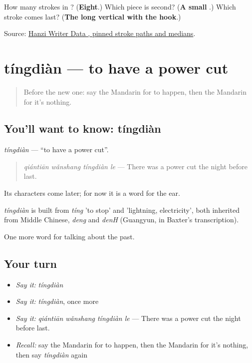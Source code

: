 \begin{tcolorbox}[breakable,colback=teal!4,colframe=teal!35!black,title={Before you move on}]
How many strokes in ? (\textbf{Eight}.) Which piece is second? (\textbf{A small }.) Which stroke comes last? (\textbf{The long vertical with the hook}.)

Source: \href{https://raw.githubusercontent.com/chanind/hanzi-writer-data/68d10a4b21150cae5e1ebbd223eed289cf32d90c/data/\%E4\%BA\%8B.json}{Hanzi Writer Data , pinned stroke paths and medians}.
\end{tcolorbox}
\section[tíngdiàn]{tíngdiàn — to have a power cut}

\label{lesson:ZH-C167-tingdian}



\begin{quote}
Before the new one: say the Mandarin for to happen, then the Mandarin for it's nothing.
\end{quote}

\subsection*{You'll want to know: tíngdiàn}
\emph{tíngdiàn} — \textquotedblleft{}to have a power cut\textquotedblright{}.

\begin{quote}
\emph{qiántiān wǎnshang tíngdiàn le} — There was a power cut the night before last.
\end{quote}

Its characters come later; for now it is a word for the ear.

\begin{cousinweb}
\emph{tíngdiàn} is built from \emph{tíng} 'to stop' and  'lightning, electricity', both inherited from Middle Chinese, \emph{deng} and \emph{denH} (Guangyun, in Baxter's transcription).
\end{cousinweb}

\begin{grammarlens}[title={What you've built}]
One more word for talking about the past.
\end{grammarlens}

\subsection*{Your turn}
\begin{itemize}
\raggedright
  \item \emph{Say it:} \emph{tíngdiàn}
  \item \emph{Say it:} \emph{tíngdiàn}, once more
  \item \emph{Say it:} \emph{qiántiān wǎnshang tíngdiàn le} — There was a power cut the night before last.
  \item \emph{Recall:} say the Mandarin for to happen, then the Mandarin for it's nothing, then say \emph{tíngdiàn} again
\end{itemize}

